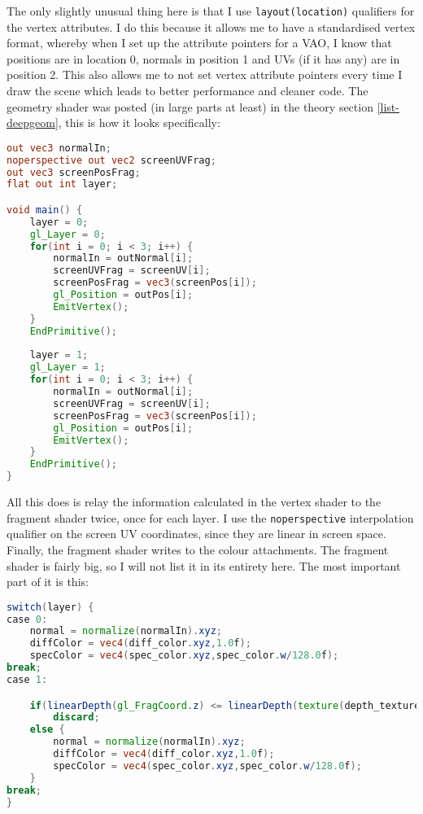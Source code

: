 The only slightly unusual thing here is that I use \verb=layout(location)= qualifiers for the vertex attributes. I do this because it allows me to have a standardised vertex format, whereby when I set up the attribute pointers for a VAO, I know that positions are in location 0, normals in position 1 and UVs (if it has any) are in position 2. This also allows me to not set vertex attribute pointers every time I draw the scene which leads to better performance and cleaner code. The geometry shader was posted (in large parts at least) in the theory section \ref{list-deepgeom}, this is how it looks specifically:

\begin{lstlisting}[caption={gen\_gbuffer.geom},language=GLSL]
out vec3 normalIn;
noperspective out vec2 screenUVFrag;
out vec3 screenPosFrag;
flat out int layer;

void main() {
	layer = 0;
	gl_Layer = 0;
	for(int i = 0; i < 3; i++) {
		normalIn = outNormal[i];
		screenUVFrag = screenUV[i];
		screenPosFrag = vec3(screenPos[i]);
		gl_Position = outPos[i];
		EmitVertex();
	}
	EndPrimitive();
	
	layer = 1;
	gl_Layer = 1;
	for(int i = 0; i < 3; i++) {
		normalIn = outNormal[i];
		screenUVFrag = screenUV[i];
		screenPosFrag = vec3(screenPos[i]);
		gl_Position = outPos[i];
		EmitVertex();
	}
	EndPrimitive();
}
\end{lstlisting}

All this does is relay the information calculated in the vertex shader to the fragment shader twice, once for each layer. I use the \verb=noperspective= interpolation qualifier on the screen UV coordinates, since they are linear in screen space. Finally, the fragment shader writes to the colour attachments. The fragment shader is fairly big, so I will not list it in its entirety here. The most important part of it is this:

\begin{lstlisting}[caption={gen\_gbuffer.frag},language=GLSL]
switch(layer) {
case 0:
	normal = normalize(normalIn).xyz;
	diffColor = vec4(diff_color.xyz,1.0f);
	specColor = vec4(spec_color.xyz,spec_color.w/128.0f);
break;
case 1:

	if(linearDepth(gl_FragCoord.z) <= linearDepth(texture(depth_texture,vec3(screenUVFrag,0)).r) + 0.01f)
		discard;
	else {
		normal = normalize(normalIn).xyz;
		diffColor = vec4(diff_color.xyz,1.0f);
		specColor = vec4(spec_color.xyz,spec_color.w/128.0f);
	}
break;
}
\end{lstlisting}

